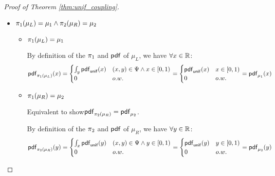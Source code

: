 \documentclass[a4paper,11pt]{article}
\begin{document}
\begin{proof}[Proof of Theorem \ref{thm:unif_coupling}]
\begin{itemize}
	\begin{itemize}
		\item $\supp(\mu_L) \subseteq \Psi$ 
		\\
		By definition of the $\pdf$ of $\mu_L$, we have: $\pr{(x,y) \samplel \mu_L}{(x,y) \notin \Psi} = 0$.
		\\%
		Then we can derive $\supp(\mu_L) \in \Psi$
		\\
		\item $\supp(\mu_R) \subseteq \Psi$
		\\
		By definition of the $\pdf$ of $\mu_R$, we have: $\pr{(x,y) \samplel \mu_R}{(x,y) \notin \Psi} = 0$.
		\\
		Then we can derive $\supp(\mu_L) \in \Psi$
	\end{itemize}		


	\item $\pi_1(\mu_L) = \mu_1 \land \pi_2(\mu_R) = \mu_2$
	
	\begin{itemize}
		\item $\pi_1(\mu_L) = \mu_1$ 


		By definition of the $\pi_1$ and $\pdf$ of $\mu_L$, we have $\forall x \in \mathbb{R}$:
		\[
			\mathsf{pdf}_{\pi_1(\mu_L)}(x) = 
			\begin{cases}
			\int_{y}\mathsf{pdf}_{\mathsf{unif}}(x) & (x,y) \in \Psi \land x \in [0, 1)\\
			0       & o.w.
			\end{cases} 
			= 
			\begin{cases}
			\mathsf{pdf}_{\mathsf{unif}}(x) & x \in [0, 1)\\
			0       & o.w.
			\end{cases}
			=
			\mathsf{pdf}_{\mu_1}(x)
		\]

		\item $\pi_1(\mu_R) = \mu_2$ 

		Equivalent to show$\mathsf{pdf}_{\pi_2(\mu_R)}  = \mathsf{pdf}_{\mu_2}$.

		By definition of the $\pi_2$ and $\pdf$ of $\mu_R$, we have $\forall y \in \mathbb{R}$:
		\[
			\mathsf{pdf}_{\pi_2(\mu_R)}(y) = 
			\begin{cases}
			\int_{x}\mathsf{pdf}_{\mathsf{unif}}(y) & (x,y) \in \Psi \land y \in [0, 1)\\
			0       & o.w.
			\end{cases} 
			= 
			\begin{cases}
			\mathsf{pdf}_{\mathsf{unif}}(y) & y \in [0, 1)\\
			0       & o.w.
			\end{cases}
			=
			\mathsf{pdf}_{\mu_2}(y)
		\]
	\end{itemize}	


\end{itemize}
\end{proof}
\end{document}
